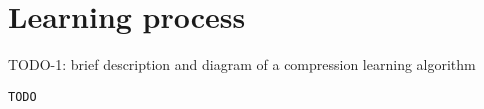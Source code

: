 \section{Learning process}





% 

TODO-1: brief description and diagram of a compression learning algorithm












\begin{verbatim}
TODO
\end{verbatim}

\iffalse
TODO-1-1: result: worse than iterative learning since it misses multi-column opportunities
TODO-1-2: advantage: faster execution (one column at a time; suitable for columnar storage)
TODO-2: comparison with the other algorithms & improvements brought to OR by them
\fi



